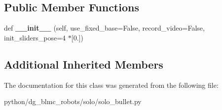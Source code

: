 \subsection*{Public Member Functions}
\begin{DoxyCompactItemize}
\item 
def {\bfseries \+\_\+\+\_\+init\+\_\+\+\_\+} (self, use\+\_\+fixed\+\_\+base=False, record\+\_\+video=False, init\+\_\+sliders\+\_\+pose=4 $\ast$\mbox{[}0.\mbox{]})\hypertarget{classdg__blmc__robots_1_1solo_1_1solo__bullet_1_1QuadrupedBulletRobot_a7a7cd71aaff5bd10e06b9d750bedf67f}{}\label{classdg__blmc__robots_1_1solo_1_1solo__bullet_1_1QuadrupedBulletRobot_a7a7cd71aaff5bd10e06b9d750bedf67f}

\end{DoxyCompactItemize}
\subsection*{Additional Inherited Members}


The documentation for this class was generated from the following file\+:\begin{DoxyCompactItemize}
\item 
python/dg\+\_\+blmc\+\_\+robots/solo/solo\+\_\+bullet.\+py\end{DoxyCompactItemize}
